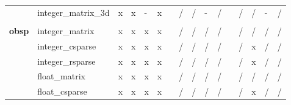 \documentclass{article}
\begin{document}
\begin{longtable}{llllllllllllllll}
                & integer\_matrix\_3d       & \cellcolor[HTML]{B7E1CD}x & \cellcolor[HTML]{B7E1CD}x & \cellcolor[HTML]{CFE2F3}- & \cellcolor[HTML]{B7E1CD}x &  & \cellcolor[HTML]{F4CCCC}/ & \cellcolor[HTML]{F4CCCC}/ & \cellcolor[HTML]{CFE2F3}- & \cellcolor[HTML]{F4CCCC}/ &  & \cellcolor[HTML]{F4CCCC}/ & \cellcolor[HTML]{F4CCCC}/ & \cellcolor[HTML]{CFE2F3}- & \cellcolor[HTML]{F4CCCC}/ \\
                &                           &                           &                           &                           &                           &  &                           &                           &                           &                           &  &                           &                           &                           &                           \\
\textbf{obsp}   & integer\_matrix           & \cellcolor[HTML]{B7E1CD}x & \cellcolor[HTML]{B7E1CD}x & \cellcolor[HTML]{B7E1CD}x & \cellcolor[HTML]{B7E1CD}x &  & \cellcolor[HTML]{F4CCCC}/ & \cellcolor[HTML]{F4CCCC}/ & \cellcolor[HTML]{F4CCCC}/ & \cellcolor[HTML]{F4CCCC}/ &  & \cellcolor[HTML]{F4CCCC}/ & \cellcolor[HTML]{F4CCCC}/ & \cellcolor[HTML]{F4CCCC}/ & \cellcolor[HTML]{F4CCCC}/ \\
                & integer\_csparse          & \cellcolor[HTML]{B7E1CD}x & \cellcolor[HTML]{B7E1CD}x & \cellcolor[HTML]{B7E1CD}x & \cellcolor[HTML]{B7E1CD}x &  & \cellcolor[HTML]{F4CCCC}/ & \cellcolor[HTML]{F4CCCC}/ & \cellcolor[HTML]{F4CCCC}/ & \cellcolor[HTML]{F4CCCC}/ &  & \cellcolor[HTML]{F4CCCC}/ & \cellcolor[HTML]{B7E1CD}x & \cellcolor[HTML]{F4CCCC}/ & \cellcolor[HTML]{F4CCCC}/ \\
                & integer\_rsparse          & \cellcolor[HTML]{B7E1CD}x & \cellcolor[HTML]{B7E1CD}x & \cellcolor[HTML]{B7E1CD}x & \cellcolor[HTML]{B7E1CD}x &  & \cellcolor[HTML]{F4CCCC}/ & \cellcolor[HTML]{F4CCCC}/ & \cellcolor[HTML]{F4CCCC}/ & \cellcolor[HTML]{F4CCCC}/ &  & \cellcolor[HTML]{F4CCCC}/ & \cellcolor[HTML]{B7E1CD}x & \cellcolor[HTML]{F4CCCC}/ & \cellcolor[HTML]{F4CCCC}/ \\
                & float\_matrix             & \cellcolor[HTML]{B7E1CD}x & \cellcolor[HTML]{B7E1CD}x & \cellcolor[HTML]{B7E1CD}x & \cellcolor[HTML]{B7E1CD}x &  & \cellcolor[HTML]{F4CCCC}/ & \cellcolor[HTML]{F4CCCC}/ & \cellcolor[HTML]{F4CCCC}/ & \cellcolor[HTML]{F4CCCC}/ &  & \cellcolor[HTML]{F4CCCC}/ & \cellcolor[HTML]{F4CCCC}/ & \cellcolor[HTML]{F4CCCC}/ & \cellcolor[HTML]{F4CCCC}/ \\
                & float\_csparse            & \cellcolor[HTML]{B7E1CD}x & \cellcolor[HTML]{B7E1CD}x & \cellcolor[HTML]{B7E1CD}x & \cellcolor[HTML]{B7E1CD}x &  & \cellcolor[HTML]{F4CCCC}/ & \cellcolor[HTML]{F4CCCC}/ & \cellcolor[HTML]{F4CCCC}/ & \cellcolor[HTML]{F4CCCC}/ &  & \cellcolor[HTML]{F4CCCC}/ & \cellcolor[HTML]{B7E1CD}x & \cellcolor[HTML]{F4CCCC}/ & \cellcolor[HTML]{F4CCCC}/ \\

\end{longtable}
\end{document}
